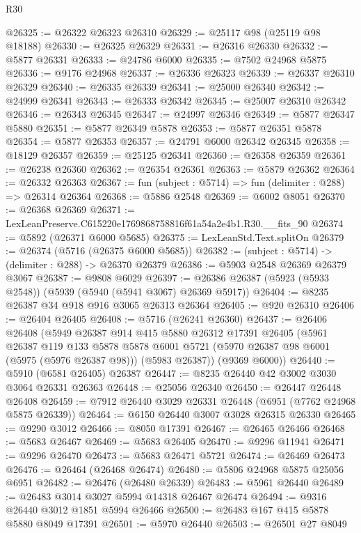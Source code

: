 \begin{lexlean}{R30}
\begin{coremodule}
@26325 := @26322 @26323 @26310
@26329 := @25117 @98 (@25119 @98 @18188)
@26330 := @26325 @26329
@26331 := @26316 @26330
@26332 := @5877 @26331
@26333 := @24786 @6000
@26335 := @7502 @24968 @5875
@26336 := @9176 @24968
@26337 := @26336 @26323
@26339 := @26337 @26310 @26329
@26340 := @26335 @26339
@26341 := @25000 @26340
@26342 := @24999 @26341
@26343 := @26333 @26342
@26345 := @25007 @26310 @26342
@26346 := @26343 @26345
@26347 := @24997 @26346
@26349 := @5877 @26347 @5880
@26351 := @5877 @26349 @5878
@26353 := @5877 @26351 @5878
@26354 := @5877 @26353
@26357 := @24791 @6000 @26342 @26345
@26358 := @18129 @26357
@26359 := @25125 @26341
@26360 := @26358 @26359
@26361 := @26238 @26360
@26362 := @26354 @26361
@26363 := @5879 @26362
@26364 := @26332 @26363
@26367 := fun (subject : @5714) => fun (delimiter : @288) => @26314 @26364
@26368 := @5886 @2548
@26369 := @6002 @8051
@26370 := @26368 @26369
@26371 := LexLeanPreserve.C615220e1769868758816f61a54a2e4b1.R30.__fits_90
@26374 := @5892 (@26371 @6000 @5685)
@26375 := LexLeanStd.Text.splitOn
@26379 := @26374 (@5716 (@26375 @6000 @5685))
@26382 := (subject : @5714) -> (delimiter : @288) -> @26370 @26379
@26386 := @5903 @2548 @26369 @26379 @3067
@26387 := @9808 @6029
@26397 := @26386 @26387 (@5923 (@5933 @2548)) (@5939 (@5940 (@5941 @3067) @26369 @5917))
@26404 := @8235 @26387 @34 @918 @916 @3065 @26313 @26364
@26405 := @920 @26310
@26406 := @26404 @26405
@26408 := @5716 (@26241 @26360)
@26437 := @26406
    @26408
    (@5949
      @26387
      @914
      @415
      @5880
      @26312
      @17391
      @26405
      (@5961
        @26387
        @119
        @133
        @5878
        @5878
        @6001
        @5721
        (@5970 @26387 @98 @6001 (@5975 (@5976 @26387 @98)))
        (@5983 @26387))
      (@9369 @6000))
@26440 := @5910 (@6581 @26405) @26387
@26447 := @8235 @26440 @42 @3002 @3030 @3064 @26331 @26363
@26448 := @25056 @26340
@26450 := @26447 @26448 @26408
@26459 := @7912 @26440 @3029 @26331 @26448 (@6951 (@7762 @24968 @5875 @26339))
@26464 := @6150 @26440 @3007 @3028 @26315 @26330
@26465 := @9290 @3012
@26466 := @8050 @17391
@26467 := @26465 @26466
@26468 := @5683 @26467
@26469 := @5683 @26405
@26470 := @9296 @11941
@26471 := @9296 @26470
@26473 := @5683 @26471 @5721
@26474 := @26469 @26473
@26476 := @26464 (@26468 @26474)
@26480 := @5806 @24968 @5875 @25056 @6951
@26482 := @26476 (@26480 @26339)
@26483 := @5961 @26440
@26489 := @26483 @3014 @3027 @5994 @14318 @26467 @26474
@26494 := @9316 @26440 @3012 @1851 @5994 @26466
@26500 := @26483 @167 @415 @5878 @5880 @8049 @17391
@26501 := @5970 @26440
@26503 := @26501 @27 @8049

\end{coremodule}
\end{lexlean}
